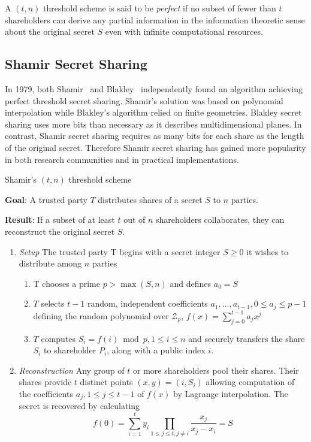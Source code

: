 \begin{defn}
\label{def:threshold_scheme}
 A $\left( t, n \right)$ threshold scheme is said to be \textit{perfect} if no subset of fewer than $t$ shareholders can derive any partial information in the information theoretic sense about the original secret $S$ even with infinite computational resources.
\end{defn}

\subsection{Shamir Secret Sharing}
In 1979, both Shamir~\cite{art:Shamir79} and Blakley~\cite{art:Blakley79} independently found an algorithm achieving perfect threshold secret sharing. Shamir's solution was based on polynomial interpolation while Blakley's algorithm relied on finite geometries. Blakley secret sharing uses more bits than necessary as it describes multidimensional planes. In contrast, Shamir secret sharing requires as many bits for each share as the length of the original secret. Therefore Shamir secret sharing has gained more popularity in both research communities and in practical implementations.

\begin{algorithm}
\caption{Shamir's $\left( t, n \right)$ threshold scheme~\cite{book:handbook_of_applied_cryptography} }
\label{alg:shamirs_threshold_sheme}
 \textbf{Goal}: A trusted party $T$ distributes shares of a secret $S$ to $n$ parties.
 
 \textbf{Result}: If a subset of at least $t$ out of $n$ shareholders collaborates, they can reconstruct the original secret $S$.
 \begin{enumerate}
  \item \textit{Setup} The trusted party T begins with a secret integer $S \geq 0$ it wishes to distribute among $n$ parties
   \begin{enumerate}
    \item T chooses a prime $p > \max \left( S, n \right)$ and defines $a_0 = S$
    \item $T$ selects $t-1$ random, independent coefficients $a_1, \ldots, a_{t-1}, 0 \leq a_j \leq p-1$ defining the random polynomial over $\mathcal{Z}_p$, $f \left( x \right) = \sum^{t-1}_{j=0} a_j x^j$
    \item $T$ computes $S_i = f \left( i \right) \bmod p, 1 \leq i \leq n$ and securely transfers the share $S_i$ to shareholder $P_i$, along with a public index $i$.
   \end{enumerate}
   \item \textit{Reconstruction} Any group of $t$ or more shareholders pool their shares. Their shares provide $t$ distinct points $\left( x, y \right) = \left( i, S_i \right)$ allowing computation of the coefficients $a_j, 1 \leq j \leq t-1$ of $f \left( x \right)$ by Lagrange interpolation. The secret is recovered by calculating
 \begin{equation*}
  f \left( 0 \right) = \sum^t_{i=1}y_i \prod_{1 \leq j \leq t, j \neq i} \frac{x_j}{x_j-x_i} = S
 \end{equation*}
 \end{enumerate}
\end{algorithm}

